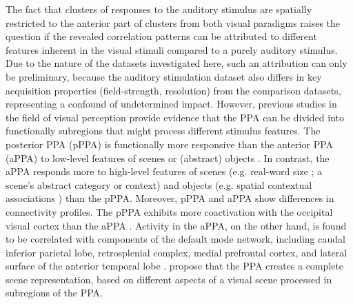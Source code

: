 \documentclass[english,11pt]{article}
\begin{document}
The fact that clusters of responses to the auditory stimulus are spatially
restricted to the anterior part of clusters from both visual paradigms raises
the question if the revealed correlation patterns can be attributed to different
features inherent in the visual stimuli compared to a purely auditory stimulus.
Due to the nature of the datasets investigated here, such an attribution can
only be preliminary, because the auditory stimulation dataset also differs in
key acquisition properties (field-strength, resolution) from the comparison
datasets, representing a confound of undetermined impact.
However, previous studies in the field of visual perception provide evidence
that the PPA can be divided into functionally subregions that might process
different stimulus features.
The posterior PPA (pPPA) is functionally more responsive than the anterior PPA
(aPPA) to low-level features of scenes or (abstract) objects
\citep{baldassano2013differential, lescroart2019human, nasr2014thinking,
rajimehr2011parahippocampal}.
In contrast, the aPPA responds more to high-level features of scenes (e.g.
real-word size \citep{park2015parametric}; a scene's abstract category or
context\citep{marchette2015outside, watson2016patterns}) and objects (e.g.
spatial contextual associations \citep{aminoff2007parahippocampal,
aminoff2013role}) than the pPPA.
Moreover, pPPA and aPPA show differences in connectivity profiles.
The pPPA exhibits more coactivation with the occipital visual cortex than the
aPPA \citep{baldassano2013differential, baldassano2016two}.
Activity in the aPPA, on the other hand, is found to be correlated with
components of the default mode network, including caudal inferior parietal lobe,
retrosplenial complex, medial prefrontal cortex, and lateral surface of the
anterior temporal lobe \citep{baldassano2013differential, baldassano2016two}.
\citet{baldassano2013differential} propose that the PPA creates a complete scene
representation, based on different aspects of a visual scene processed in
subregions of the PPA.
\end{document}
